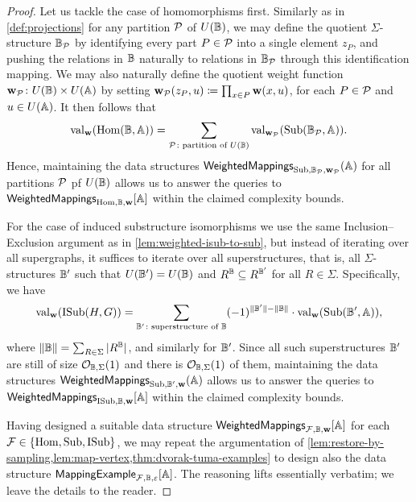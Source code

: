 \begin{proof}
	
	Let us tackle the case of homomorphisms first. Similarly as in \cref{def:projections} for any partition $\mathcal{P}$ of $U(\mathbb{B})$, we may define the quotient $\Sigma$-structure $\mathbb{B}_{\mathcal{P}}$ by identifying every part $P\in\mathcal{P}$ into a single element $z_P$, and pushing the relations in $\mathbb{B}$ naturally to relations in $\mathbb{B}_{\mathcal{P}}$ through this identification mapping. We may also naturally define the quotient weight function $\mathbf{w}_{\mathcal{P}}\colon U(\mathbb{B})\times U(\mathbb{A})$ by setting $\mathbf{w}_{\mathcal{P}}(z_P,u)\coloneqq \prod_{x\in P} \mathbf{w}(x,u)$, for each $P\in \mathcal{P}$ and $u\in U(\mathbb{A})$. It then follows that 
	\[\mathrm{val}_{\mathbf{w}}(\mathrm{Hom}(\mathbb{B}, \mathbb{A})) = \sum_{\mathcal{P}\colon \textrm{partition of }U(\mathbb{B})} \mathrm{val}_{\mathbf{w}_{\mathcal{P}}}(\mathrm{Sub}(\mathbb{B}_{\mathcal{P}}, \mathbb{A})).\]
	Hence, maintaining the data structures $\mathsf{WeightedMappings}_{\mathrm{Sub}, \mathbb{B}_{\mathcal{P}}, \mathbf{w}_{\mathcal{P}}}(\mathbb{A})$ for all partitions $\mathcal{P}$ pf $U(\mathbb{B})$ allows us to answer the queries to $\mathsf{WeightedMappings}_{\mathrm{Hom}, \mathbb{B}, \mathbf{w}}[\mathbb{A}]$ within the claimed complexity bounds.
	
	For the case of induced substructure isomorphisms we use the same Inclusion--Exclusion argument as in \cref{lem:weighted-isub-to-sub}, but instead of iterating over all supergraphs, it suffices to iterate over all superstructures, that is, all $\Sigma$-structures $\mathbb{B}'$ such that $U(\mathbb{B}') = U(\mathbb{B})$ and $R^{\mathbb{B}} \subseteq R^{\mathbb{B}'}$ for all $R\in \Sigma$. Specifically, we have
	\[\mathrm{val}_{\mathbf{w}}(\mathrm{ISub}(H, G)) = \sum_{\mathbb{B}'\colon \textrm{superstructure of } \mathbb{B}} (-1)^{\|\mathbb{B}'\| - \|\mathbb{B}\|}\cdot \mathrm{val}_{\mathbf{w}}(\mathrm{Sub}(\mathbb{B}', \mathbb{A})),\]  where $\|\mathbb{B}\| = \sum_{R\in \Sigma} |R^{\mathbb{B}}|$, and similarly for $\mathbb{B}'$. Since all such superstructures $\mathbb{B}'$ are still of size $\mathcal{O}_{\mathbb{B},\Sigma}(1)$ and there is $\mathcal{O}_{\mathbb{B},\Sigma}(1)$ of them, maintaining the data structures $\mathsf{WeightedMappings}_{\mathrm{Sub}, \mathbb{B}', \mathbf{w}}(\mathbb{A})$ allows us to answer the queries to $\mathsf{WeightedMappings}_{\mathrm{ISub}, \mathbb{B}, \mathbf{w}}[\mathbb{A}]$ within the claimed complexity bounds.
	
	Having designed a suitable data structure $\mathsf{WeightedMappings}_{\mathcal{F}, \mathbb{B}, \mathbf{w}}[\mathbb{A}]$ for each $\mathcal{F}\in \{\mathrm{Hom},\mathrm{Sub},\mathrm{ISub}\}$, we may repeat the argumentation of \cref{lem:restore-by-sampling,lem:map-vertex,thm:dvorak-tuma-examples} to design also the data structure $\mathsf{MappingExample}_{\mathcal{F}, \mathbb{B},\varepsilon}[\mathbb{A}]$. The reasoning lifts essentially verbatim; we leave the details to the reader.
\end{proof}
	
